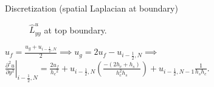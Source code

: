 \documentclass{beamer}
\begin{document}
	\begin{frame}{Discretization (spatial Laplacian at boundary)}
	\begin{figure}[H]
	  \caption{$\hat{L}^u_{yy}$ at top boundary.}\label{fig:luxx-top}
	\end{figure}	
	$u_{f} = \frac{u_g+u_{i-\frac{1}{2},N}}{2}\implies u_g=2u_{f}-u_{i-\frac{1}{2},N}\implies$
	$\left.\frac{\partial^2 u}{\partial y^2}\right|_{i-\frac{1}{2},N}=\frac{2 u_f}{h_c{ }^2}+u_{i-\frac{1}{2},N}\left(\frac{-\left(2 h_c+h_s\right)}{h_c^2 h_s}\right)+u_{i-\frac{1}{2},N-1} \frac{1}{h_s h_c}.$
	\end{frame}
	
\end{document}
